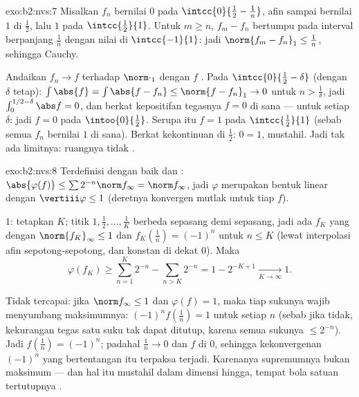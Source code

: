 \begin{solution}{exo:b2:nvs:7}
Misalkan $f_n$ bernilai $0$ pada $\intcc{0}{\frac12 - \frac1n}$, afin
sampai bernilai $1$ di $\frac12$, lalu $1$ pada $\intcc{\frac12}{1}$.
Untuk $m \geq n$, $f_m - f_n$ bertumpu pada interval berpanjang
$\frac1n$ dengan nilai di $\intcc{-1}{1}$: jadi $\norm{f_m - f_n}_1 \leq
\frac1n$, sehingga Cauchy.

Andaikan $f_n \to f$ terhadap $\norm\cdot_1$ dengan $f$ . Pada
$\intcc{0}{\frac12 - \delta}$ (dengan $\delta$ tetap): $\int \abs{f} =
\int\abs{f - f_n} \leq \norm{f - f_n}_1 \to 0$ untuk $n >
\frac1\delta$, jadi $\int_0^{1/2 - \delta}\abs f = 0$, dan berkat
kepositifan tegasnya $f = 0$ di sana --- untuk setiap $\delta$: jadi $f =
0$ pada $\intoo{0}{\frac12}$. Serupa itu $f = 1$ pada
$\intcc{\frac12}{1}$ (sebab semua $f_n$ bernilai $1$ di sana). Berkat
kekontinuan di $\frac12$: $0 = 1$, mustahil. Jadi tak ada limitnya:
ruangnya tidak .
\end{solution}

\begin{solution}{exo:b2:nvs:8}
Terdefinisi dengan baik dan : $\abs{\varphi(f)} \leq \sum 2^{-n}
\norm f_\infty = \norm f_\infty$, jadi $\varphi$ merupakan bentuk linear
dengan $\vertiii\varphi \leq 1$ (deretnya konvergen mutlak untuk
tiap $f$).

 $1$: tetapkan $K$; titik $1, \frac12, \dots, \frac1K$ berbeda
sepasang demi sepasang, jadi ada $f_K$ yang  dengan
$\norm{f_K}_\infty \leq 1$ dan $f_K(\frac1n) = (-1)^n$ untuk $n \leq K$
(lewat interpolasi afin sepotong-sepotong, dan konstan di dekat $0$). Maka
\[
\varphi(f_K) \geq \sum_{n=1}^{K} 2^{-n} - \sum_{n > K} 2^{-n}
= 1 - 2^{-K+1} \xrightarrow[K \to \infty]{} 1 .
\]

Tidak tercapai: jika $\norm f_\infty \leq 1$ dan $\varphi(f) = 1$, maka
tiap sukunya wajib menyumbang maksimumnya: $(-1)^n f(\frac1n) = 1$ untuk
setiap $n$ (sebab jika tidak, kekurangan tegas satu suku tak dapat
ditutup, karena semua sukunya $\leq 2^{-n}$). Jadi $f(\frac1n) =
(-1)^n$; padahal $\frac1n \to 0$ dan $f$  di $0$, sehingga
kekonvergenan $(-1)^n$ yang bertentangan itu terpaksa terjadi. Karenanya
supremumnya bukan maksimum --- dan hal itu mustahil dalam dimensi
hingga, tempat bola satuan tertutupnya .
\end{solution}

